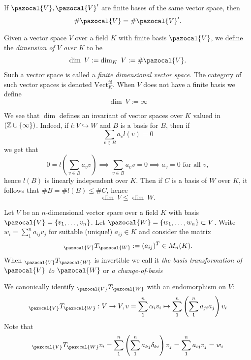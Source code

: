 \begin{corollary}
    If $\pazocal{V},\pazocal{V}'$ are finite bases of the same vector space, then 
    $$
        \#\pazocal{V}=\#\pazocal{V}'.
    $$
\end{corollary}
\begin{definition}
    Given a vector space $V$ over a field $K$ with finite basis $\pazocal{V}$, we define the \emph{dimension of $V$ over $K$} to be 
    $$
        \dim\ V:=\dim_K\ V := \#\pazocal{V}.
    $$
    Such a vector space is called a \emph{finite dimensional vector space}. The category of such vector spaces is denoted $\mathrm{Vect}^{\mathrm{fd}}_K$. When $V$ does not have a finite basis we define
    $$
        \dim\ V := \infty
    $$
\end{definition}
\begin{remark}
    We see that $\dim$ defines an invariant of vector spaces over $K$ valued in $(\mathbb{Z}\cup\{\infty\})$. Indeed, if $l:V\hookrightarrow W$ and $B$ is a basis for $B$, then if 
    $$
        \sum_{v\in B} a_v l(v)=0
    $$
    we get that 
    $$
        0 = l\left(\sum_{v\in B} a_v v \right) \implies \sum_{v\in B} a_v v =0 \implies a_v=0 \text{ for all } v,
    $$
    hence $l(B)$ is linearly independent over $K$. Then if $C$ is a basis of $W$ over $K$, it follows that $\#B=\#l(B)\leq \# C$, hence 
    $$\dim \ V \leq \dim \ W.$$
\end{remark}
\begin{definition}
    Let $V$ be an $n$-dimensional vector space over a field $K$ with basis $\pazocal{V}=\{v_1,\dots,v_n\}$. Let $\pazocal{W}=\{w_1,\dots,w_n\}\subset V$. Write $w_i = \sum_1^n a_{ij}v_j$ for suitable (unique!) $a_{ij}\in K$ and consider the matrix 
    $$_\pazocal{V}T_\pazocal{W} := (a_{ij})^T\in M_n(K).$$
    When $_\pazocal{V}T_\pazocal{W}$ is invertible we call it \textit{the basis transformation of $\pazocal{V}$ to $\pazocal{W}$} or \textit{a change-of-basis}  
\end{definition}
\begin{remark}
    We canonically identify $_\pazocal{V}T_\pazocal{W}$ with an endomorphism on $V$:
    \begin{gather*}
        _\pazocal{V}T_\pazocal{W} : V\rightarrow V,
        v = \sum_1^n \alpha_i v_i \mapsto \sum_1^n \left(\sum_1^n a_{ji}a_j \right)v_i
    \end{gather*}
    Note that 
    $$_\pazocal{V}T_\pazocal{W} v_i= \sum_1^n\left(\sum_1^n a_{kj}\delta_{ki}\right)v_j = \sum_1^n a_{ij}v_j = w_i $$
\end{remark}
